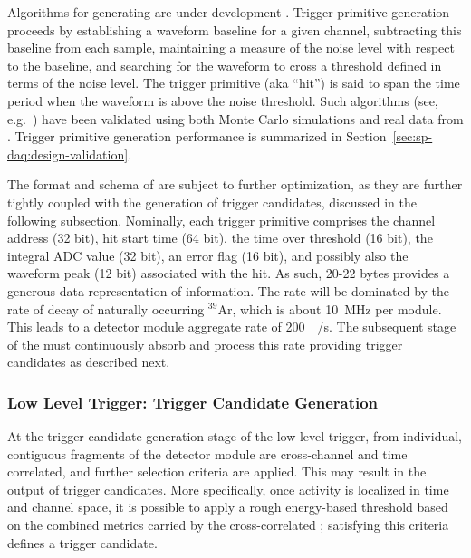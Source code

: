 
Algorithms for generating  are under development
\cite{bib:docdb11275}.  Trigger primitive generation proceeds
by establishing a waveform baseline
for a given channel, subtracting this baseline from each sample, maintaining
a measure of the noise level with respect to the baseline, and searching for the waveform to cross a
threshold defined in terms of the noise level. 
The  trigger primitive  (aka ``hit'') is said to span the time period when the waveform is above the noise threshold.
Such algorithms (see, e.g.~\cite{bib:docdb11236}) have been validated
using both Monte Carlo simulations and 
real data from . 
Trigger primitive generation performance is summarized in
Section~\ref{sec:sp-daq:design-validation}.

The format and schema of  are subject to further
optimization, as they are further tightly coupled with the generation of
trigger candidates, discussed in the following subsection. Nominally,
each trigger primitive comprises the channel address (32 bit), hit
start time (64 bit), the time over
threshold (16 bit), the integral ADC value (32 bit), an error flag (16
bit), and possibly also
the waveform peak (12 bit) associated with the hit. 
As such, 20-22 bytes provides a generous data
representation of  information. 
The  rate will be dominated by the rate of decay of naturally occurring
$^{39}$Ar, which is about \SI{10}{\mega\hertz} per module.
This leads to a detector module  aggregate rate of
\SI{200}{\mega\byte/\second}.
The subsequent stage of the  must continuously absorb and process this
rate providing trigger candidates as described next.

\subsubsection{Low Level Trigger: Trigger Candidate Generation}

At the trigger candidate generation stage of the low level trigger,
 from individual, contiguous fragments of the
detector 
module are cross-channel and time correlated, and further selection
criteria are applied. This may result in the
output of trigger candidates. 
More specifically, once activity is localized in time and channel
space, it is
possible to apply a rough energy-based threshold based on the combined
metrics carried by the cross-correlated ;
satisfying this criteria defines a trigger candidate. 


